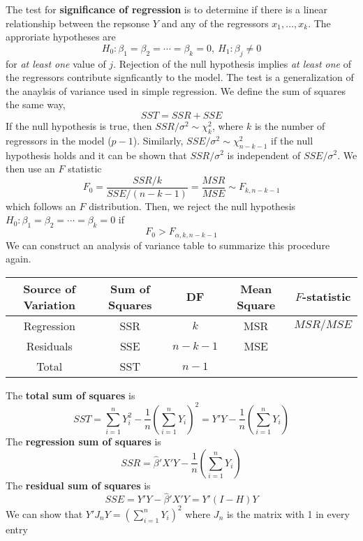 The test for \textbf{significance of regression} is to determine if there is a linear relationship between the repsonse $Y$ and any of the regressors $x_1, \ldots, x_k$. The approriate hypotheses are 
\[H_0: \beta_1 = \beta_2 = \cdots = \beta_k = 0, \ H_1: \beta_j \neq 0\]
for \emph{at least one} value of $j$. Rejection of the null hypothesis implies \emph{at least one} of the regressors contribute signficantly to the model. The test is a generalization of the anaylsis of variance used in simple regression. We define the sum of squares the same way,
\[SST = SSR + SSE\]
If the null hypothesis is true, then $SSR/\sigma^2 \sim \chi_k^2$, where $k$ is the number of regressors in the model ($p-1$). Similarly, $SSE/\sigma^2 \sim \chi^2_{n-k-1}$ if the null hypothesis holds and it can be shown that $SSR/\sigma^2$ is independent of $SSE/\sigma^2$. We then use an $F$ statistic 
\[F_0 = \frac{SSR/k}{SSE/(n-k-1)} = \frac{MSR}{MSE} \sim F_{k,n-k-1}\]
which follows an $F$ distribution. Then, we reject the null hypothesis $H_0: \beta_1 = \beta_2 = \cdots = \beta_k = 0$ if 
\[F_0 > F_{\alpha, k, n-k-1}\]
We can construct an analysis of variance table to summarize this procedure again. 
\begin{center}
    \begin{tabular}{|c|c|c|c|c|}
        \hline
        Source of Variation & Sum of Squares & DF & Mean Square & $F$-statistic\\
        \hline
        \hline
        Regression & SSR & $k$ & MSR & $MSR/MSE$\\
        Residuals & SSE & $n-k-1$ & MSE & \\
        Total & SST & $n-1$ & & \\
        \hline
    \end{tabular}
\end{center}
The \textbf{total sum of squares} is 
\[SST = \sum_{i=1}^n Y_i^2 -  \frac{1}{n}\left(\sum_{i=1}^n Y_i\right)^2 = Y'Y - \frac{1}{n}\left(\sum_{i=1}^n Y_i\right)\]
The \textbf{regression sum of squares} is 
\[SSR = \hat{\beta}'X'Y -\frac{1}{n}\left(\sum_{i=1}^n Y_i\right)\]
The \textbf{residual sum of squares} is 
\[SSE = Y'Y - \hat{\beta}'X'Y = Y'(I - H)Y\]
We can show that $Y'J_{n}Y = \left(\sum_{i=1}^n Y_i\right)^2$ where $J_n$ is the matrix with 1 in every entry
